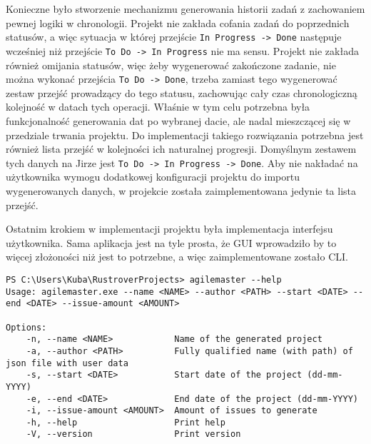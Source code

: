 
Konieczne było stworzenie mechanizmu generowania historii zadań z zachowaniem pewnej logiki w chronologii.
Projekt nie zakłada cofania zadań do poprzednich statusów, a więc sytuacja w której przejście \texttt{In Progress -> Done} następuje
wcześniej niż przejście \texttt{To Do -> In Progress} nie ma sensu.
Projekt nie zakłada również omijania statusów, więc żeby wygenerować zakończone zadanie, nie można wykonać przejścia \texttt{To Do -> Done},
trzeba zamiast tego wygenerować zestaw przejść prowadzący do tego statusu, zachowując cały czas chronologiczną kolejność w datach
tych operacji. Właśnie w tym celu potrzebna była funkcjonalność generowania dat po wybranej dacie, ale nadal mieszczącej się w przedziale trwania projektu.
Do implementacji takiego rozwiązania potrzebna jest również lista przejść w kolejności ich naturalnej progresji.
Domyślnym zestawem tych danych na Jirze jest \texttt{To Do -> In Progress -> Done}.
Aby nie nakładać na użytkownika wymogu dodatkowej konfiguracji projektu do importu wygenerowanych danych, w projekcie została zaimplementowana
jedynie ta lista przejść.

Ostatnim krokiem w implementacji projektu była implementacja interfejsu użytkownika. Sama aplikacja jest na tyle prosta, że GUI wprowadziło by to więcej
złożoności niż jest to potrzebne, a więc zaimplementowane zostało CLI.

\begin{lstlisting}[caption=CLI programu agilemaster]
PS C:\Users\Kuba\RustroverProjects> agilemaster --help
Usage: agilemaster.exe --name <NAME> --author <PATH> --start <DATE> --end <DATE> --issue-amount <AMOUNT>

Options:
    -n, --name <NAME>            Name of the generated project
    -a, --author <PATH>          Fully qualified name (with path) of json file with user data
    -s, --start <DATE>           Start date of the project (dd-mm-YYYY)
    -e, --end <DATE>             End date of the project (dd-mm-YYYY)
    -i, --issue-amount <AMOUNT>  Amount of issues to generate
    -h, --help                   Print help
    -V, --version                Print version
\end{lstlisting}

